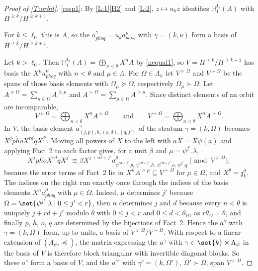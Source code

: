 \documentclass[a4paper,11pt]{amsart}
\numberwithin{equation}{subsection}
\theoremstyle{definition}
\theoremstyle{theorem}
\theoremstyle{remark}
\newcommand\kapp{{\mathfrak{z}}}
\newcommand\HH{\mathbb{H}}
\begin{document}
\begin{proof}[Proof of \autoref{T:orbit}]
\noindent\autoref{resp1}: By \autoref{L:1}\autoref{H2} and \autoref{L:2}, $z\mapsto u_kz$
identifies $\HH^{\kapp_k}_1(A)$ with $H^{\ge k}/H^{\ge k+1}$.

\noindent For $k\le\ell_0$ this is $A$,
so the $a^{\gamma}_{phoq}=u_ka^{\nu}_{phoq}$ with $\gamma=(k,\nu)$ form a basis of
$H^{\ge k}/H^{\ge k+1}$.

\noindent Let $k>\ell_0$. Then $\HH^{\kapp_k}_1(A)=\bigoplus_{n<\theta}X^{n}A$ by
\autoref{nequal1}, so $V=H^{\ge k}/H^{\ge k+1}$ has basis the $X^{n}a^{\mu}_{phoq}$ with
$n<\theta$ and $\mu\in\Lambda$. For $\Omega\in\Lambda_\psi$ let
$V^{\succeq\Omega}$ and $V^{\succ\Omega}$ be the spans of those basis elements with
$\Omega_\mu\succeq\Omega$, respectively $\Omega_\mu\succ\Omega$. Let
$A^{\succeq\Omega}=\sum_{\mu\in\Omega}A^{\ge\mu}$ and $A^{\succ\Omega}=\sum_{\mu\in\Omega}A^{>\mu}$.
Since distinct elements of an orbit are incomparable,
\[
  V^{\succeq\Omega}=\bigoplus_{n<\theta}X^{n}A^{\succeq\Omega}\qquad\text{and}\qquad
  V^{\succ\Omega}=\bigoplus_{n<\theta}X^{n}A^{\succ\Omega}.
\]
In $V$, the basis element $a^{\gamma}_{(j,p),h,(o,d),(q,j')}$ of the stratum $\gamma=(k,\Omega)$
becomes $X^{j}\dot p\dot h\dot oX^{rd}\dot qX^{j'}$. Moving all powers of $X$ to the left with
$aX=X\psi(a)$ and applying Fact~2 to each factor gives, for a unit $\beta$ and
$\mu=\psi^{j'}.\lambda$,
\[
  X^{j}\dot p\dot h\dot oX^{rd}\dot qX^{j'}\equiv
  \beta X^{j+rd+j'}a^{\mu}_{\psi^{rd+j'}.p,\ \psi^{rd+j'}.h,\ \psi^{rd+j'}.o,\ \psi^{j'}.q}
  \pmod{V^{\succ\Omega}},
\]
because the error terms of Fact~2 lie in $X^{n}A^{>\mu}\subseteq V^{\succ\Omega}$ for
$\mu\in\Omega$, and $X^{\theta}=\kapp_k^{\theta}$. The indices on the right run exactly once
through the indices of the basis elements $X^{n}a^{\mu}_{phoq}$ with $\mu\in\Omega$. Indeed,
$\mu$ determines $j'$ because $\Omega=\set{\psi^{j'}.\lambda\mid0\le j'<r}$, then $n$
determines $j$ and $d$ because every $n<\theta$ is uniquely $j+rd+j'$ modulo $\theta$ with
$0\le j<r$ and $0\le d<\theta_\Omega$, as $r\theta_\Omega=\theta$, and finally $p$, $h$,
$o$, $q$ are determined by the bijections of Fact~2. Hence the $a^{\gamma}$ with
$\gamma=(k,\Omega)$ form, up to units, a basis of $V^{\succeq\Omega}/V^{\succ\Omega}$. With
respect to a linear extension of $(\Lambda_\psi,\preceq)$, the matrix expressing the
$a^{\gamma}$ with $\gamma\in\set{k}\times\Lambda_\psi$ in the basis of $V$ is therefore block
triangular with invertible diagonal blocks. So these $a^{\gamma}$ form a basis of $V$, and the
$a^{\gamma'}$ with $\gamma'=(k,\Omega')$, $\Omega'\succ\Omega$, span $V^{\succ\Omega}$.


\end{proof}
\end{document}
